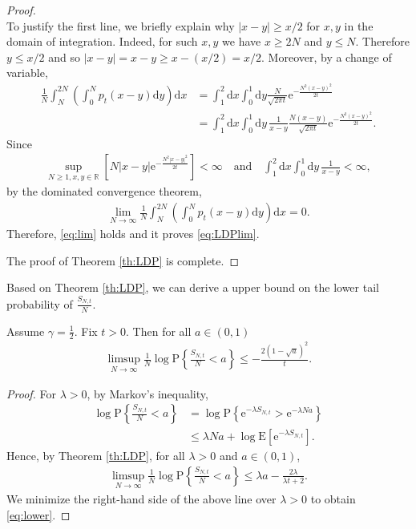 \documentclass[12pt, reqno]{amsart}
\newcommand{\R}{{\mathbb{R}}}
\newcommand{\E}{\mathrm{E}}
\renewcommand{\P}{\mathrm{P}}
\renewcommand{\d}{\mathrm{d}}
\newcommand{\<}{\langle}
\renewcommand{\>}{\rangle}
\newcommand{\e}{\mathrm{e}}
\begin{document}
\begin{proof}
\begin{equation*}
\end{equation*}
To justify the first line, we briefly explain why $|x-y|\ge x/2$ for $x,y$ in 
the domain of integration.  
Indeed, for such $x,y$ we have $x\ge2N$ and $y\le N$.  Therefore $y\le x/2$ 
and so $|x-y|=x-y\ge x-(x/2)=x/2$.  
Moreover, by a change of variable, 
\begin{align*}
\frac1N\int^{2N}_N \left(\int_0^N p_t(x-y)\d y\right) \d x&=\int_1^2\d x \int_0^1 \d y \frac{N}{\sqrt{2\pi t}} \e^{-\frac{N^2(x-y)^2}{2t}}\\
&=\int_1^2\d x \int_0^1 \d y \, \frac1{x-y}\frac{N(x-y)}{\sqrt{2\pi t}} \e^{-\frac{N^2(x-y)^2}{2t}}.
\end{align*}
Since 
\begin{align*}
\sup_{N\geq1, x, y\in \R} \left[N|x-y|\e^{-\frac{N^2|x-y|^2}{2t}}\right]<\infty \quad \text{and}\quad \int_1^2\d x \int_0^1 \d y \, \frac1{x-y}<\infty,
\end{align*}
by the dominated convergence theorem, 
\begin{align*}
\lim_{N\to\infty}\frac1N\int^{2N}_N \left(\int_0^N p_t(x-y)\d y\right) \d x=0.
\end{align*}
Therefore,  \eqref{eq:lim} holds and it proves \eqref{eq:LDPlim}. 

The proof of Theorem \ref{th:LDP} is complete.
\end{proof}

Based on Theorem \ref{th:LDP}, we can derive a upper bound on the lower tail probability of $\frac{S_{N,t}}{N}$.
\begin{corollary}
          Assume $\gamma=\frac12$. Fix $t>0$. Then for all $a\in (0, 1)$
          \begin{align}\label{eq:lower}
          \limsup_{N\to\infty} \frac1 N \log \P\left\{\frac{S_{N,t}}{N}<a\right\}\leq -\frac{2(1-\sqrt{a})^2}{t}.
          \end{align}
\end{corollary}
\begin{proof}
          For $\lambda >0$, by Markov's inequality,
          \begin{align*}
           \log \P\left\{\frac{S_{N,t}}{N}<a\right\} &=\log \P\left\{\e^{-\lambda S_{N,t}} >\e^{-\lambda Na}\right\}\\
           &\leq \lambda N a +\log  \E\left[\e^{-\lambda S_{N,t}}\right].
          \end{align*}
          Hence, by Theorem \ref{th:LDP}, for all $\lambda>0$ and $a\in (0, 1)$,
          \begin{align*}
          \limsup_{N\to\infty} \frac1 N \log \P\left\{\frac{S_{N,t}}{N}<a\right\} \leq \lambda a -\frac{2\lambda}{\lambda t+2}.
          \end{align*}
          We minimize the right-hand side of the above line over $\lambda >0$ to obtain \eqref{eq:lower}. 
\end{proof}
\end{document}
